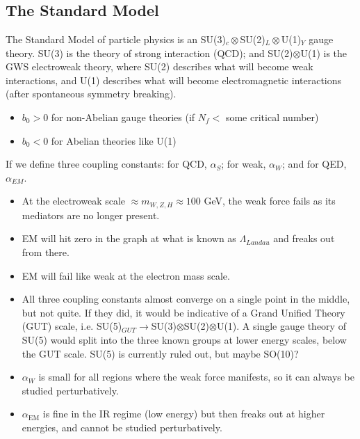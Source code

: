 \documentclass[relqm.tex]{subfiles}
\begin{document}
\chapter{}
\section{The Standard Model}
The Standard Model of particle physics is an SU(3)$_c\otimes$SU(2)$_L\otimes$U(1)$_Y$ gauge theory. 
SU(3) is the theory of strong interaction (QCD); and SU(2)$\otimes$U(1) is the GWS electroweak theory, where SU(2) describes what will become weak interactions, and U(1) describes what will become electromagnetic interactions (after spontaneous symmetry breaking).
\begin{itemize}
    \item $b_0>0$ for non-Abelian gauge theories (if $N_f <$ some critical number)
    \item $b_0<0$ for Abelian theories like U(1)
\end{itemize}
If we define three coupling constants: for QCD, $\alpha_S$; for weak, $\alpha_W$; and for QED, $\alpha_{EM}$.
\begin{figure}[H]
    \centering
\end{figure}
\begin{itemize}
    \item At the electroweak scale $\approx m_{W,Z,H}\approx100$ GeV, the weak force fails as its mediators are no longer present. 
    \item EM will hit zero in the graph at what is known as $\Lambda_{Landau}$ and freaks out from there.
    \item EM will fail like weak at the electron mass scale.
    \item All three coupling constants almost converge on a single point in the middle, but not quite. If they did, it would be indicative of a Grand Unified Theory (GUT) scale, i.e. SU(5)$_{GUT}\to$SU(3)$\otimes$SU(2)$\otimes$U(1). A single gauge theory of SU(5) would split into the three known groups at lower energy scales, below the GUT scale. 
        SU(5) is currently ruled out, but maybe SO(10)?
    \item $\alpha_W$ is small for all regions where the weak force manifests, so it can always be studied perturbatively.
    \item $\alpha_{\text{EM}}$ is fine in the IR regime (low energy) but then freaks out at higher energies, and cannot be studied perturbatively.
\end{itemize}
\end{document}
